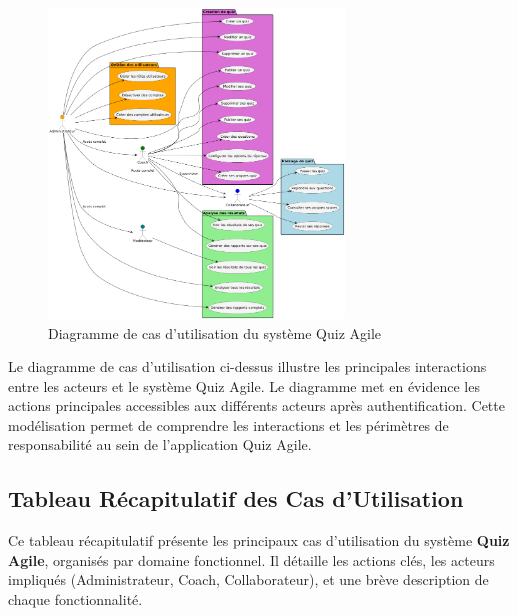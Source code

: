 \documentclass[12pt,a4paper]{report}
\begin{document}
\begin{figure}[htbp]
    \centering
    \includegraphics[width=0.7\textwidth]{latex_media/media/image14.png}
    \caption{Diagramme de cas d'utilisation du système Quiz Agile}
    \label{fig:cas-utilisation}
\end{figure}

Le diagramme de cas d'utilisation ci-dessus illustre les principales interactions entre les acteurs et le système Quiz Agile. Le diagramme met en évidence les actions principales accessibles aux différents acteurs après authentification. Cette modélisation permet de comprendre les interactions et les périmètres de responsabilité au sein de l'application Quiz Agile.

\subsection{Tableau Récapitulatif des Cas d'Utilisation}

Ce tableau récapitulatif présente les principaux cas d'utilisation du système \textbf{Quiz Agile}, organisés par domaine fonctionnel. Il détaille les actions clés, les acteurs impliqués (Administrateur, Coach, Collaborateur), et une brève description de chaque fonctionnalité.
\end{document}
